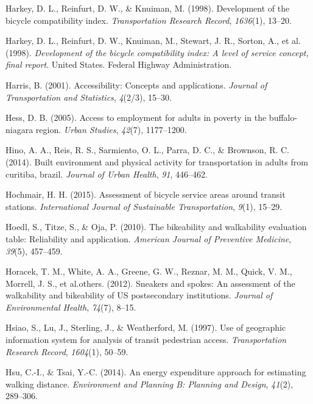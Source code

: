 \documentclass[
11pt, %
oneside, %
english, %
singlespacing, %
]{macthesis} %
\newlength{\cslhangindent}
\newenvironment{CSLReferences}[2] %
 {%
  \setlength{\parindent}{0pt}
  \ifodd #1 \everypar{\setlength{\hangindent}{\cslhangindent}}\ignorespaces\fi
  \ifnum #2 > 0
  \setlength{\parskip}{#2\baselineskip}
  \fi
 }%
 {}
\begin{document}
\begin{CSLReferences}{1}{0}
Harkey, D. L., Reinfurt, D. W., \& Knuiman, M. (1998). Development of the bicycle compatibility index. \emph{Transportation Research Record}, \emph{1636}(1), 13--20.

Harkey, D. L., Reinfurt, D. W., Knuiman, M., Stewart, J. R., Sorton, A., et al. (1998). \emph{Development of the bicycle compatibility index: A level of service concept, final report}. United States. Federal Highway Administration.

Harris, B. (2001). Accessibility: Concepts and applications. \emph{Journal of Transportation and Statistics}, \emph{4}(2/3), 15--30.

Hess, D. B. (2005). Access to employment for adults in poverty in the buffalo-niagara region. \emph{Urban Studies}, \emph{42}(7), 1177--1200.

Hino, A. A., Reis, R. S., Sarmiento, O. L., Parra, D. C., \& Brownson, R. C. (2014). Built environment and physical activity for transportation in adults from curitiba, brazil. \emph{Journal of Urban Health}, \emph{91}, 446--462.

Hochmair, H. H. (2015). Assessment of bicycle service areas around transit stations. \emph{International Journal of Sustainable Transportation}, \emph{9}(1), 15--29.

Hoedl, S., Titze, S., \& Oja, P. (2010). The bikeability and walkability evaluation table: Reliability and application. \emph{American Journal of Preventive Medicine}, \emph{39}(5), 457--459.

Horacek, T. M., White, A. A., Greene, G. W., Reznar, M. M., Quick, V. M., Morrell, J. S., et al.others. (2012). Sneakers and spokes: An assessment of the walkability and bikeability of US postsecondary institutions. \emph{Journal of Environmental Health}, \emph{74}(7), 8--15.

Hsiao, S., Lu, J., Sterling, J., \& Weatherford, M. (1997). Use of geographic information system for analysis of transit pedestrian access. \emph{Transportation Research Record}, \emph{1604}(1), 50--59.

Hsu, C.-I., \& Tsai, Y.-C. (2014). An energy expenditure approach for estimating walking distance. \emph{Environment and Planning B: Planning and Design}, \emph{41}(2), 289--306.


\end{CSLReferences}
\end{document}
